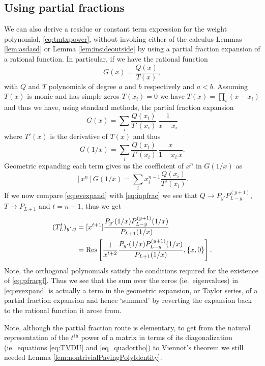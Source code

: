\documentclass[11pt,a4paper]{article}
\DeclareMathOperator{\res}{\text{Res}}
\begin{document}
\subsection*{Using partial fractions}

We can also derive a residue or constant term expression for the weight polynomial, \eqref{eq:tmtxpower},   without  invoking either of the calculus Lemmas \ref{lem:asdasd} or Lemma \ref{lem:insideoutside} by using a partial fraction expansion of a rational function. In particular, if we have the rational function
\[
	G(x)=\frac{Q(x)}{T(x)},
\]
with $Q$ and $T$ polynomials of degree $a$ and $b$ respectively and $a<b$. Assuming $T(x)$ is monic and has simple zeros $T(x_i)=0$  we have $T(x)=\prod_i(x-x_i)$ and thus we have, using standard methods, the partial fraction expansion
\[
	G(x)=  \sum_i \frac{ Q(x_i)}{T'(x_i)}\, \frac{1}{x-x_i}
\]
where $T'(x)$ is the derivative of $T(x)$ and thus
\begin{equation}\label{eq:pfracgf}
		G(1/x)=  \sum_i \frac{ Q(x_i)}{T'(x_i)}\, \frac{x}{1-x_i\,x}.
\end{equation}
Geometric expanding each term gives us the coefficient of $x^n$ in $G(1/x)$ as
\begin{equation}\label{eq:inpfrac} 
	[x^n]G(1/x) = \sum_i x_i^{n-1}\frac{ Q(x_i)}{T'(x_i)}.
\end{equation}
If we now compare \eqref{eq:evexpand} with \eqref{eq:inpfrac} we see that $Q\to P_{y'}  P^{(y+1)}_{L-y}$, $T\to P_{L+1}$ and $t=n-1$, thus we  get 
\begin{align}
	(T_L^t)_{y',y}& =[x^{t+1}] \frac{ P_{y'}(1/x ) P^{(y+1)}_{L-y}(1/x ) }{P_{L+1}(1/x)}\notag\\
	&=\res \left[ \frac{1}{x^{t+2}}   \frac{ P_{y'}(1/x ) P^{(y+1)}_{L-y}(1/x ) }{P_{L+1}(1/x)},\{x,0 \} \right].
\end{align}
Note, the orthogonal polynomials satisfy the conditions required for the existence of \eqref{eq:pfracgf}.
Thus we see that the sum over the zeros (ie.\ eigenvalues) in \eqref{eq:evexpand} is actually a term in the geometric expansion, or Taylor series, of a partial fraction expansion and hence `summed' by reverting the expansion back to the rational function it arose from.  

Note, although the partial fraction route is elementary,   to get  from the natural representation of the $t^\text{th}$ power of a matrix in terms of its diagonalization  (ie.\ equations \eqref{eq:TVDU} and \eqref{eq_quadortho}) to Viennot's theorem we still needed    Lemma \ref{lem:nontrivialPavingPolyIdentity}. 
\end{document}
